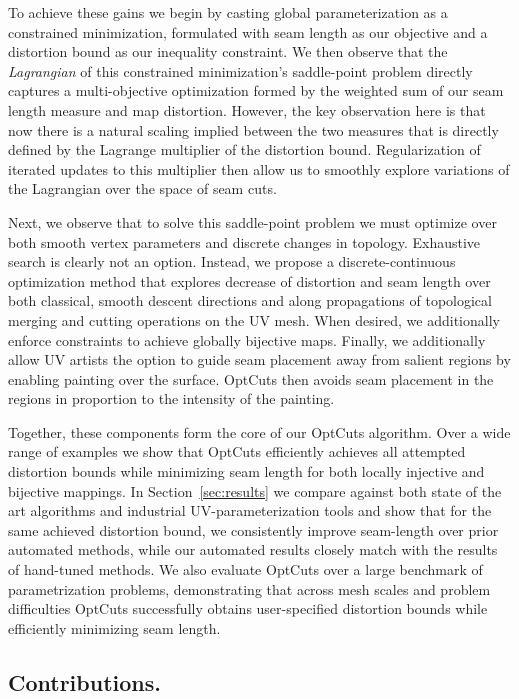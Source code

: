   To achieve these gains we begin by casting global parameterization as a constrained minimization, formulated with seam length as our objective and a distortion bound as our inequality constraint. We then observe that the \emph{Lagrangian} of this constrained minimization's saddle-point problem directly captures a multi-objective optimization formed by the weighted sum of our seam length measure and map distortion. However, the key observation here is that now there is a natural scaling implied between the two measures that is directly defined by the Lagrange multiplier of the distortion bound. Regularization of iterated updates to this multiplier then allow us to smoothly explore variations of the Lagrangian over the space of seam cuts. 
  
  Next, we observe that to solve this saddle-point problem we must optimize over both smooth vertex parameters and discrete changes in topology. Exhaustive search is clearly not an option. Instead, we propose a discrete-continuous optimization method that explores decrease of distortion and seam length over both classical, smooth descent directions and along propagations of topological merging and cutting operations on the UV mesh. When desired, we additionally enforce constraints to achieve globally bijective maps. Finally, we additionally allow UV artists the option to guide seam placement away from salient regions by enabling painting over the surface. OptCuts then avoids seam placement in the regions in proportion to the intensity of the painting.
  
  Together, these components form the core of our OptCuts algorithm. Over a wide range of examples we show that OptCuts efficiently achieves all attempted distortion bounds while minimizing seam length for both locally injective and bijective mappings. In Section~\ref{sec:results} we compare against both state of the art algorithms and industrial UV-parameterization tools and show that for the same achieved distortion bound, we consistently improve seam-length over prior automated methods, while our automated results closely match with the results of hand-tuned methods. We also evaluate OptCuts over a large benchmark of parametrization problems, demonstrating that across mesh scales and problem difficulties OptCuts successfully obtains user-specified distortion bounds while efficiently minimizing seam length. 
  
\subsection{Contributions.}

